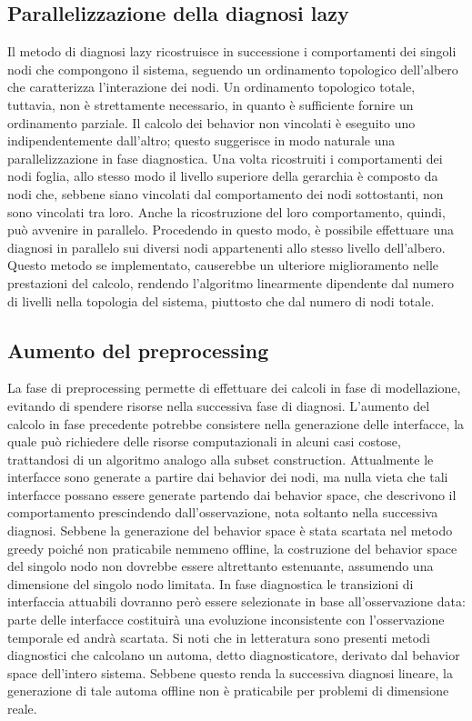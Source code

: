 \subsection{Parallelizzazione della diagnosi lazy}
Il metodo di diagnosi lazy ricostruisce in successione i comportamenti dei singoli nodi che compongono il sistema, seguendo un ordinamento topologico dell'albero che caratterizza l'interazione dei nodi. Un ordinamento topologico totale, tuttavia, non è strettamente necessario, in quanto è sufficiente fornire un ordinamento parziale. Il calcolo dei behavior non vincolati è eseguito uno indipendentemente dall'altro; questo suggerisce in modo naturale una parallelizzazione in fase diagnostica. Una volta ricostruiti i comportamenti dei nodi foglia, allo stesso modo il livello superiore della gerarchia è composto da nodi che, sebbene siano vincolati dal comportamento dei nodi sottostanti, non sono vincolati tra loro. Anche la ricostruzione del loro comportamento, quindi, può avvenire in parallelo. Procedendo in questo modo, è possibile effettuare una diagnosi in parallelo sui diversi nodi appartenenti allo stesso livello dell'albero. Questo metodo se implementato, causerebbe un ulteriore miglioramento nelle prestazioni del calcolo, rendendo l'algoritmo linearmente dipendente dal numero di livelli nella topologia del sistema, piuttosto che dal numero di nodi totale. 

\subsection{Aumento del preprocessing}
La fase di preprocessing permette di effettuare dei calcoli in fase di modellazione, evitando di spendere risorse nella successiva fase di diagnosi. L'aumento del calcolo in fase precedente potrebbe consistere nella generazione delle interfacce, la quale può richiedere delle risorse computazionali in alcuni casi costose, trattandosi di un algoritmo analogo alla subset construction. Attualmente le interfacce sono generate a partire dai behavior dei nodi, ma nulla vieta che tali interfacce possano essere generate partendo dai behavior space, che descrivono il comportamento prescindendo dall'osservazione, nota soltanto nella successiva diagnosi. Sebbene la generazione del behavior space è stata scartata nel metodo greedy poiché non praticabile nemmeno offline, la costruzione del behavior space del singolo nodo non dovrebbe essere altrettanto estenuante, assumendo una dimensione del singolo nodo limitata. In fase diagnostica le transizioni di interfaccia attuabili dovranno però essere selezionate in base all'osservazione data: parte delle interfacce costituirà una evoluzione inconsistente con l'osservazione temporale ed andrà scartata. Si noti che in letteratura sono presenti metodi diagnostici che calcolano un automa, detto diagnosticatore, derivato dal behavior space dell'intero sistema. Sebbene questo renda la successiva diagnosi lineare, la generazione di tale automa offline non è praticabile per problemi di dimensione reale.


